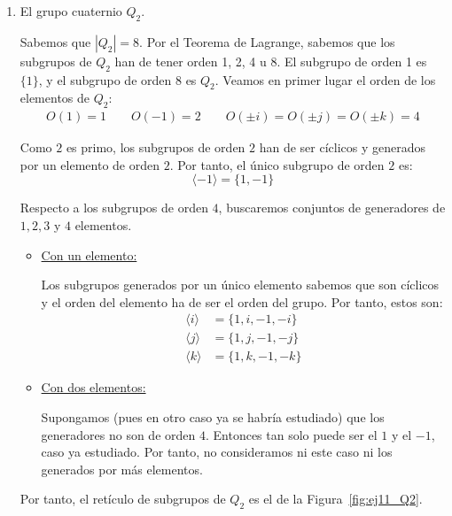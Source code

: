 \begin{ejercicio}
\begin{enumerate}
        \item El grupo cuaternio $Q_2$.
        
        Sabemos que $|Q_2|=8$. Por el Teorema de Lagrange, sabemos que los subgrupos de $Q_2$ han de tener orden 1, 2, 4 u 8. El subgrupo de orden 1 es $\{1\}$, y el subgrupo de orden 8 es $Q_2$. Veamos en primer lugar el orden de los elementos de $Q_2$:
        \begin{gather*}
            O(1)=1\qquad O(-1)=2\qquad O(\pm i)=O(\pm j)=O(\pm k)=4
        \end{gather*}

        Como $2$ es primo, los subgrupos de orden $2$ han de ser cíclicos y generados por un elemento de orden $2$. Por tanto, el único subgrupo de orden $2$ es:
        \begin{equation*}
            \langle -1\rangle = \{1,-1\}
        \end{equation*}

        Respecto a los subgrupos de orden $4$, buscaremos conjuntos de generadores de $1,2,3$ y $4$ elementos.
        \begin{itemize}
            \item \ul{Con un elemento:}
            
            Los subgrupos generados por un único elemento sabemos que son cíclicos y el orden del elemento ha de ser el orden del grupo. Por tanto, estos son:
            \begin{align*}
                \langle i\rangle &= \{1,i,-1,-i\}\\
                \langle j\rangle &= \{1,j,-1,-j\}\\
                \langle k\rangle &= \{1,k,-1,-k\}
            \end{align*}

            \item \ul{Con dos elementos:}
            
            Supongamos (pues en otro caso ya se habría estudiado) que los generadores no son de orden $4$. Entonces tan solo puede ser el $1$ y el $-1$, caso ya estudiado. Por tanto, no consideramos ni este caso ni los generados por más elementos.
        \end{itemize}

        Por tanto, el retículo de subgrupos de $Q_2$ es el de la Figura~\ref{fig:ej11_Q2}.
        \begin{figure}
            \centering
\end{figure}
\end{enumerate}
\end{ejercicio}
